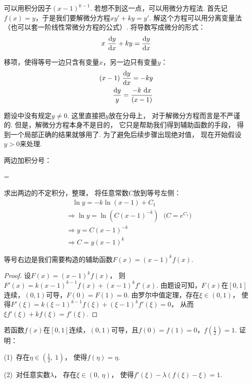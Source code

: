 \begin{analysis}
可以用积分因子$(x-1)^{k-1}$. 若想不到这一点，可以用微分方程法.
首先记$f(x) = y$，于是我们要解微分方程$xy'+ky=y'$. 解这个方程可以用分离变量法（也可以套一阶线性常微分方程的公式）.
将导数写成微分的形式：
$$
x ~\frac{\mathrm{d} y}{\mathrm{d} x} + ky = \frac{\mathrm{d} y}{\mathrm{d} x}
$$\par
移项，使得等号一边只含有变量$x$，另一边只有变量$y$：
\begin{equation}
    \begin{aligned}
        (x-1) ~\frac{\mathrm{d} y}{\mathrm{d} x} = -ky \\
        \frac{\mathrm{d} y}{y} = \frac{-k~\mathrm{d} x}{(x-1)}
        \nonumber
    \end{aligned}
\end{equation}

题设中没有规定$y \ne 0$.
这里直接把$y$放在分母上，
对于解微分方程而言是不严谨的.
但是，解微分方程本身不是目的，
它只是帮助我们得到辅助函数的手段，
得到一个局部正确的结果就够用了.
为了避免后续步骤出现绝对值，
现在开始假设$y > 0$来处理.

两边加积分号：
\begin{eq1}
    \int {} = \int {}
\end{eq1}

求出两边的不定积分，整理，
将任意常数$C$放到等号左侧：
\begin{equation}
    \begin{aligned}
        &~~~~\ln y = -k \ln (x-1) + C_1 \\
        &\Rightarrow \ln y = \ln \left(C(x-1)^{-k}\right)~~~\text{($C = e^{C_1}$)} \\
        &\Rightarrow  y = C(x-1)^{-k}  \\
        &\Rightarrow  C = y(x-1)^{k}
        \nonumber
    \end{aligned}
\end{equation} \par
等号右边是我们需要构造的辅助函数$F(x) = (x-1)^k f(x)$.
\end{analysis}

\begin{proof}
设$F(x)=(x-1)^{k}f(x)$，
则$F'(x) = k(x-1)^{k-1}f(x) + (x-1)^k f'(x)$.
由题设可知，$F(x)$在$[0,1]$连续，$(0,1)$可导，$F(0) = F(1) = 0$.
由罗尔中值定理，存在$\xi \in (0,1)$，
使得$F'(\xi) = k(\xi-1)^{k-1}f(\xi) + (\xi-1)^k f'(\xi) = 0$，
从而$\xi f'(\xi) +k f(\xi) = f'(\xi)$.
\end{proof}

\begin{example}
\label{ex:ch04-30}
若函数$f(x)$在$[0,1]$连续，$(0,1)$可导，且$f(0)=f(1)=0$，$f\left(\frac{1}{2}\right)=1$.
证明：

(1)~存在$\eta \in \left(\frac{1}{2},~1\right)$，
使得$f(\eta)=\eta$.

(2)~对任意实数$\lambda$，
存在$\xi \in (0, ~\eta)$，
使得$f'(\xi)-\lambda (f(\xi)-\xi) = 1$.
\end{example}

